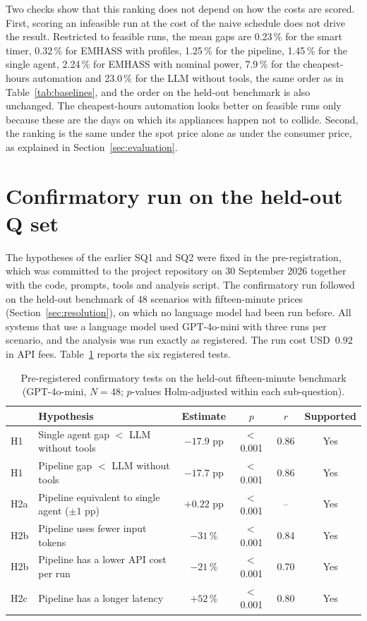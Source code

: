 Two checks show that this ranking does not depend on how the costs are
scored. First, scoring an infeasible run at the cost of the naive
schedule does not drive the result. Restricted to feasible runs, the
mean gaps are 0.23\,\% for the smart timer, 0.32\,\% for EMHASS with
profiles, 1.25\,\% for the pipeline, 1.45\,\% for the single agent,
2.24\,\% for EMHASS with nominal power, 7.9\,\% for the cheapest-hours
automation and 23.0\,\% for the LLM without tools, the same order as in
Table~\ref{tab:baselines}, and the order on the held-out benchmark is
also unchanged. The cheapest-hours automation looks better on feasible
runs only because these are the days on which its appliances happen not
to collide. Second, the ranking is the same under the spot price alone
as under the consumer price, as explained in
Section~\ref{sec:evaluation}.

\section{Confirmatory run on the held-out Q set}
\label{sec:confirmatory}

The hypotheses of the earlier SQ1 and SQ2 were fixed in the pre-registration, which
was committed to the project repository on 30 September 2026 together
with the code, prompts, tools and analysis script. The confirmatory run
followed on the held-out benchmark of 48 scenarios with fifteen-minute
prices (Section~\ref{sec:resolution}), on which no language model had
been run before. All systems that use a language model used GPT-4o-mini
with three runs per scenario, and the analysis was run exactly as
registered. The run cost USD~0.92 in API fees. Table~\ref{tab:confirmatory}
reports the six registered tests.

\begin{table}[h!]
\caption{Pre-registered confirmatory tests on the held-out fifteen-minute benchmark (GPT-4o-mini, $N = 48$; $p$-values Holm-adjusted within each sub-question).}
\label{tab:confirmatory}
\small
\begin{tabularx}{\textwidth}{l>{\raggedright\arraybackslash}Xcccc}
\toprule
& Hypothesis & Estimate & $p$ & $r$ & Supported \\
\midrule
H1 & Single agent gap $<$ LLM without tools & $-17.9$ pp & $<$\,0.001 & 0.86 & Yes \\
H1 & Pipeline gap $<$ LLM without tools & $-17.7$ pp & $<$\,0.001 & 0.86 & Yes \\
H2a & Pipeline equivalent to single agent ($\pm 1$ pp) & $+0.22$ pp & $<$\,0.001 & -- & Yes \\
H2b & Pipeline uses fewer input tokens & $-31$\,\% & $<$\,0.001 & 0.84 & Yes \\
H2b & Pipeline has a lower API cost per run & $-21$\,\% & $<$\,0.001 & 0.70 & Yes \\
H2c & Pipeline has a longer latency & $+52$\,\% & $<$\,0.001 & 0.80 & Yes \\
\bottomrule
\end{tabularx}
\end{table}


